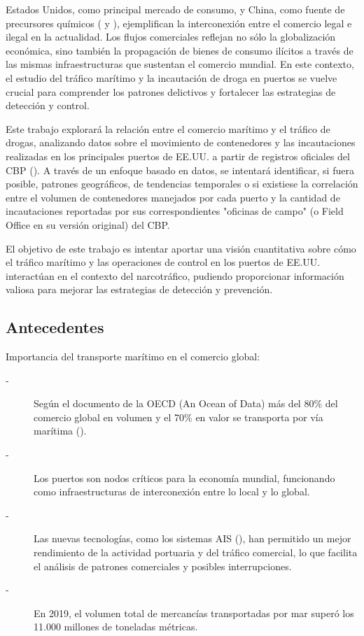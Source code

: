 \documentclass[12pt]{article}
\begin{document}
	Estados Unidos, como principal mercado de consumo, y China, como fuente de precursores químicos (\cite{justice2023indictments} y \cite{justice2023fentanyl}), ejemplifican la interconexión entre el comercio legal e ilegal en la actualidad. Los flujos comerciales reflejan no sólo la globalización económica, sino también la propagación de bienes de consumo ilícitos a través de las mismas infraestructuras que sustentan el comercio mundial. En este contexto, el estudio del tráfico marítimo y la incautación de droga en puertos se vuelve crucial para comprender los patrones delictivos y fortalecer las estrategias de detección y control.
	
	Este trabajo explorará la relación entre el comercio marítimo y el tráfico de drogas, analizando datos sobre el movimiento de contenedores y las incautaciones realizadas en los principales puertos de EE.UU. a partir de registros oficiales del CBP (\cite{cbp_website}). A través de un enfoque basado en datos, se intentará identificar, si fuera posible, patrones geográficos, de tendencias temporales o si existiese la correlación entre el volumen de contenedores manejados por cada puerto y la cantidad de incautaciones reportadas por sus correspondientes "oficinas de campo" (o Field Office en su versión original) del CBP.
	
	El objetivo de este trabajo es intentar aportar una visión cuantitativa sobre cómo el tráfico marítimo y las operaciones de control en los puertos de EE.UU. interactúan en el contexto del narcotráfico, pudiendo proporcionar información valiosa para mejorar las estrategias de detección y prevención.
	
	

	\subsection{\label{antecedentes}Antecedentes}
	Importancia del transporte marítimo en el comercio global:
	\begin{description}
		\item[-] Según el documento de la OECD (An Ocean of Data) más del 80\% del comercio global en volumen y el 70\% en valor se transporta por vía marítima (\cite{pilgrim2024ocean}).
		\item[-] Los puertos son nodos críticos para la economía mundial, funcionando como infraestructuras de interconexión entre lo local y lo global.
		\item[-] Las nuevas tecnologías, como los sistemas AIS (\cite{nauticaprofesional2025ais}), han permitido un mejor rendimiento de la actividad portuaria y del tráfico comercial, lo que facilita el análisis de patrones comerciales y posibles interrupciones.
		\item[-] En 2019, el volumen total de mercancías transportadas por mar superó los 11.000 millones de toneladas métricas. \cite{cidob2025maritime}
	\end{description}
	
\end{document}
